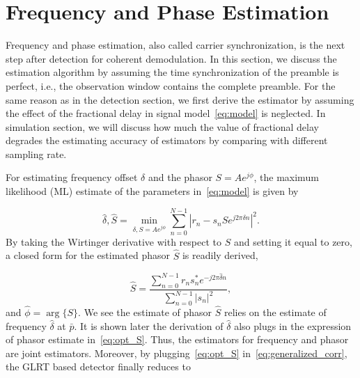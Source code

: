 \section{Frequency and Phase Estimation}%
\label{sec:freq_est}

Frequency and phase estimation, also called carrier synchronization, is the next step after detection for coherent demodulation.
In this section, we discuss the estimation algorithm by assuming the time synchronization of the preamble is perfect, i.e., 
the observation window contains the complete preamble. For the same reason as in the detection section, we first derive the estimator
by assuming the effect of the fractional delay in signal model~\eqref{eq:model} is neglected.
In simulation section, we will discuss how much the value of fractional delay degrades the estimating accuracy of estimators by
comparing with different sampling rate.

For estimating frequency offset $\delta$ and the phasor $S=Ae^{j\phi}$, the maximum likelihood (ML) estimate of the parameters in~\eqref{eq:model} is given by

\begin{equation}
\label{eq:ML_f_S}
  \hat{\delta},\hat{S}=\min_{\delta,S=Ae^{j\phi}}\sum_{n=0}^{N-1}|r_n-s_nSe^{j2\pi\delta n}|^{2}.
\end{equation}
By taking the Wirtinger derivative with respect to $S$ and setting it equal to zero, a 
closed form for the estimated phasor $\hat{S}$ is readily derived,

\begin{equation}
    \label{eq:opt_S}
    \hat{S}=\frac{\sum_{n=0}^{N-1}{r_{n}s_n^{*}e^{-j2\pi\hat{\delta} n}}}{\sum_{n=0}^{N-1}|s_{n}|^2},
  \end{equation}
and $\hat{\phi}=\arg\{S\}$. We see the estimate of phasor $\hat{S}$ relies on the estimate of frequency $\hat{\delta}$ at $\bar{p}$.
It is shown later the derivation of $\hat{\delta}$ also plugs in the expression of phasor estimate in~\eqref{eq:opt_S}. Thus, the estimators for frequency and phasor are
joint estimators. Moreover, by plugging~\eqref{eq:opt_S} in~\eqref{eq:generalized_corr}, the GLRT based detector finally reduces to

